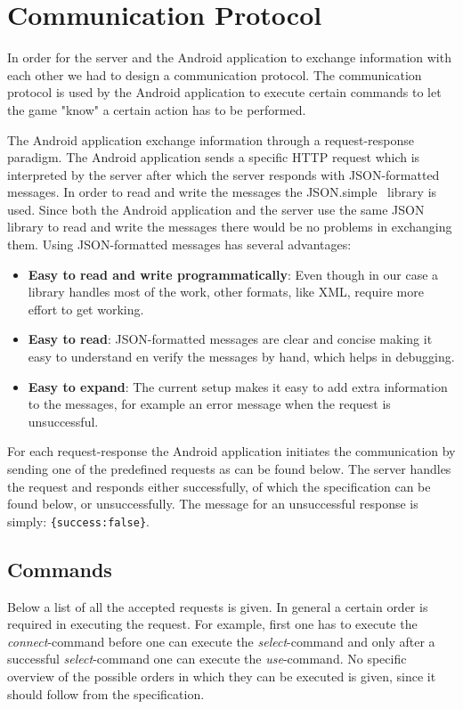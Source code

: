 \documentclass[a4paper,10pt]{article}
\begin{document}
\section{Communication Protocol}
\label{sec:communication-protocol}
In order for the server and the Android application to exchange information with each other we had to design a communication protocol.
The communication protocol is used by the Android application to execute certain commands to let the game "know" a certain action has to be performed.

The Android application exchange information through a request-response paradigm.
The Android application sends a specific HTTP request which is interpreted by the server after which the server responds with JSON-formatted messages.
In order to read and write the messages the JSON.simple~\cite{JSONsimple} library is used.
Since both the Android application and the server use the same JSON library to read and write the messages there would be no problems in exchanging them.
Using JSON-formatted messages has several advantages:
\begin{itemize}
	\item
		\textbf{Easy to read and write programmatically}:
		Even though in our case a library handles most of the work, other formats, like XML, require more effort to get working.
	\item
		\textbf{Easy to read}:
		JSON-formatted messages are clear and concise making it easy to understand en verify the messages by hand, which helps in debugging.
	\item
		\textbf{Easy to expand}:
		The current setup makes it easy to add extra information to the messages, for example an error message when the request is unsuccessful.
\end{itemize}

For each request-response the Android application initiates the communication by sending one of the predefined requests as can be found below.
The server handles the request and responds either successfully, of which the specification can be found below, or unsuccessfully.
The message for an unsuccessful response is simply: \texttt{\{success:false\}}.

\subsection{Commands}
Below a list of all the accepted requests is given.
In general a certain order is required in executing the request.
For example, first one has to execute the \emph{connect}-command before one can execute the \emph{select}-command and only after a successful \emph{select}-command one can execute the \emph{use}-command.
No specific overview of the possible orders in which they can be executed is given, since it should follow from the specification.
	
\end{document}
